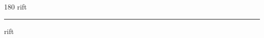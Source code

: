 
\begin{frame}
\begin{center}
\begin{turn}{180}
{\fontsize{2.5cm}{1em}\selectfont rift}
\end{turn}
\vspace{1em}\par  
\hrule
\vspace{1em}\par  
{\fontsize{2.5cm}{1em}\selectfont rift}
\end{center}
\end{frame}
